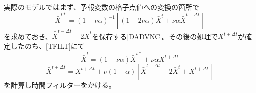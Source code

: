 \documentclass{jsbook}
\begin{document}
実際のモデルではまず、予報変数の格子点値への変換の箇所で
\begin{equation}
\bar{\bar{X}}^{t\ast}=(1-\nu \alpha)^{-1}[(1-2 \nu \alpha)\bar{X}^{t}+\nu \alpha \bar{\bar{X}}^{t-\Delta t}] 
\end{equation}
を求めておき、$\bar{\bar{X}}^{t-\Delta t}-2\bar{X}^{t}$を保存する[DADVNC]。その後の処理で$X^{t+\Delta t}$が確定したのち、[TFILT]にて
\begin{equation}
\bar{\bar{X}}^{t} = (1-\nu \alpha) \bar{\bar{X}}^{t\ast}+\nu \alpha X^{t+\Delta t} 
\end{equation}
\begin{equation}
\bar{X}^{t+\Delta t} = X^{t+\Delta t} + \nu (1-\alpha) [\bar{\bar{X}}^{t-\Delta t} - 2 \bar{X}^{t} + X^{t+\Delta t}]  
\end{equation}
を計算し時間フィルターをかける。
\end{document}
